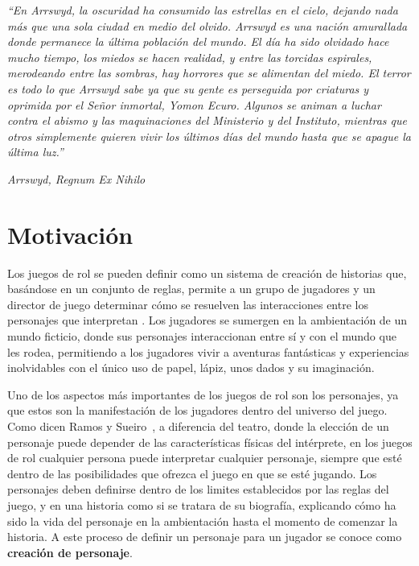 

\vspace*{\fill}
\epigraph{\textit{“En Arrswyd, la oscuridad ha consumido las estrellas en el cielo, 
dejando nada más que una sola ciudad en medio del olvido. Arrswyd es una nación amurallada 
donde permanece la última población del mundo. El día ha sido olvidado hace mucho tiempo, 
los miedos se hacen realidad, y entre las torcidas espirales, merodeando entre las sombras, 
hay horrores que se alimentan del miedo. El terror es todo lo que Arrswyd sabe ya que su gente 
es perseguida por criaturas y oprimida por el Señor inmortal, Yomon Ecuro. Algunos se animan a 
luchar contra el abismo y las maquinaciones del Ministerio y del Instituto, mientras que otros 
simplemente quieren vivir los últimos días del mundo hasta que se apague la última luz.”}}{\textit{Arrswyd, Regnum Ex Nihilo}}
\vspace*{\fill}

\newpage

\section{Motivación}
Los juegos de rol se pueden definir como un sistema de creación de historias que, basándose en un conjunto de reglas, 
permite a un grupo de jugadores y un director de juego determinar cómo se resuelven las interacciones entre los personajes que 
interpretan \autocite{Ramos-Villagrasa2010}. Los jugadores se sumergen en la ambientación de un mundo ficticio, donde sus personajes 
interaccionan entre sí y con el mundo que les rodea, permitiendo a los jugadores vivir a aventuras fantásticas y experiencias inolvidables 
con el único uso de papel, lápiz, unos dados y su imaginación. \medskip

Uno de los aspectos más importantes de los juegos de rol son los personajes, ya que estos son la manifestación de los jugadores 
dentro del universo del juego. Como dicen Ramos y Sueiro~\autocite{Ramos-Villagrasa2010}, a diferencia del teatro, donde la elección de un personaje puede depender de las características 
físicas del intérprete, en los juegos de rol cualquier persona puede interpretar cualquier personaje, siempre que esté dentro de las 
posibilidades que ofrezca el juego en que se esté jugando. Los personajes deben definirse dentro de los limites establecidos por 
las reglas del juego, y en una historia como si se tratara de su biografía, explicando cómo ha sido la vida del personaje en 
la ambientación hasta el momento de comenzar la historia. A este proceso de definir un personaje 
para un jugador se conoce como \textbf{creación de personaje}. \medskip

